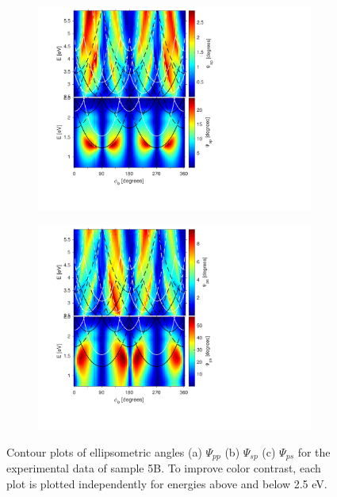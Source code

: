\begin{figure}[h]
    \begin{subfigure}{0.49\textwidth}
        \centering
        \includegraphics[width=\linewidth, trim=1.2cm  1.8cm 6.5cm 0.3cm, clip]{figures/ch4/S5B/exp/S5B_Psi_sp_exp_55.pdf}
        \caption{}
    \end{subfigure}
    \begin{subfigure}{0.49\textwidth}
        \centering
        \includegraphics[width=\linewidth, trim=1.2cm  1.8cm 6.5cm 0.3cm, clip]{figures/ch4/S5B/exp/S5B_Psi_ps_exp_55.pdf}
        \caption{}
    \end{subfigure}
    \caption{Contour plots of ellipsometric angles (a) $\Psi_{pp}$ (b) $\Psi_{sp}$ (c) $\Psi_{ps}$ for the experimental data of sample 5B. To improve color contrast, each plot is plotted independently for energies above and below 2.5 eV.}
    \label{fig:S5B_contour_Rsp&Rps_Psisp&Psips}
\end{figure}


